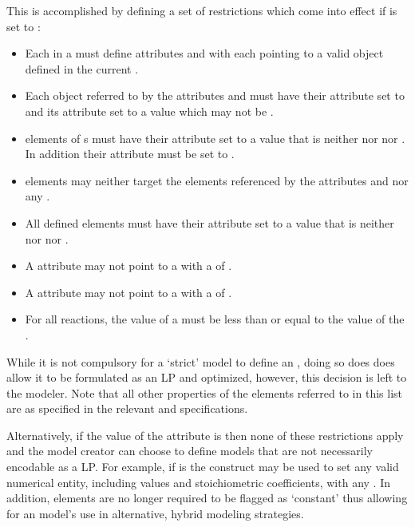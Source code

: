 This is accomplished by defining a set of restrictions which come into effect if  is set to :
%
\begin{itemize}
	\item { Each \Reaction in a \Model must define attributes  and  with each pointing to a valid \Parameter object defined in the current \Model.}
	\item {Each \Parameter object referred to by the \Reaction attributes  and  must have their  attribute set to  and its  attribute set to a  value which may not be .
	}
	\item { \SpeciesReference elements of {\Reaction}s must have their  attribute set to a  value that is neither  nor  nor . In addition their  attribute must be set to .
	}
	\item { \InitialAssignment elements may neither target the {\Parameter} elements referenced by the \Reaction attributes  and
	         nor any \SpeciesReference.
	}
	\item { All defined \FluxObjective elements must have their  attribute set to a  value that is neither  nor  nor .
	}
	\item { A \Reaction {} attribute may not point to a \Parameter with a  of .}
	\item { A \Reaction {} attribute may not point to a \Parameter with a  of .}
    \item {For all reactions, the value of a  must be less than or equal to the value of the .}

\end{itemize}
%
While it is not compulsory for a `strict' \FBC model to define an \Objective, doing so does does allow it to be formulated as an LP and optimized, however, this decision is left to the modeler. Note that all other properties of the elements referred to in this list are as specified in the relevant \sbmlthreecore and \FBC specifications.

Alternatively, if the value of the  attribute is  then none of these restrictions apply and the model creator can choose to define \FBC models that are not necessarily encodable as a LP. For example, if  is  the \InitialAssignment construct may be used to set any valid numerical entity, including \Parameter values and stoichiometric coefficients, with any . In addition, \Parameter elements are no longer required to be flagged as `constant' thus allowing for an \FBC model's use in alternative, hybrid modeling strategies.

